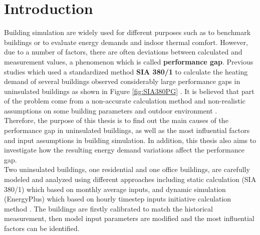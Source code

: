 \documentclass[a4paper, oneside]{discothesis}
\begin{document}
\tableofcontents

\mainmatter %

\chapter{Introduction}
	Building simulation are widely used for different purposes such as to benchmark buildings or to evaluate energy demands and indoor thermal comfort. However, due to a number of factors, there are often deviations between calculated  and measurement values, a phenomenon which is called \textbf{performance gap}. Previous studies which used a standardized method \textbf{SIA 380/1} to calculate the heating demand of several buildings observed considerably large performance gaps in uninsulated buildings as shown in Figure \ref{fig:SIA380PG} \cite{SIAPreviousreport}. It is believed that part of the problem come from a non-accurate calculation method and non-realistic assumptions on some building parameters and outdoor environment \cite{SIAPreviousreport}. \\

	
	Therefore, the purpose of this thesis is to find out the main causes of the performance gap in uninsulated buildings, as well as the most influential factors and input assumptions in building simulation. In addition, this thesis also aims to investigate how the resulting energy demand variations affect the performance gap.\\


	Two uninsulated buildings, one residential and one office buildings, are carefully modeled and analyzed using different approaches including static calculation (SIA 380/1) which based on monthly average inputs, and dynamic simulation (EnergyPlus) which based on hourly timestep inputs initiative calculation method \cite{SIAPreviousreport,SIA2024Shop,crawley2000energy}. The buildings are firstly calibrated to match the historical measurement, then model input parameters are modified and the most influential factors can be identified.\\
\end{document}
